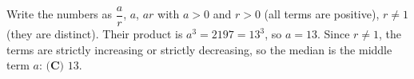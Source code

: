 Write the numbers as $\dfrac ar$, $a$, $ar$ with $a>0$ and $r>0$ (all terms are positive), $r\ne1$ (they are distinct). Their product is $a^3=2197=13^3$, so $a=13$. Since $r\ne1$, the terms are strictly increasing or strictly decreasing, so the median is the middle term $a$: $\boxed{\textbf{(C) }13}$.
